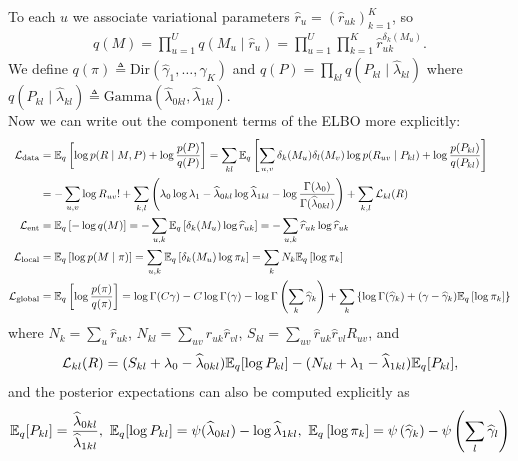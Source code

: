 \documentclass{article}
\begin{document}
 To each $u$ we associate variational parameters $\widehat r_u = \left(\widehat r_{uk}\right)_{k=1}^K$, so
\begin{align}
q(M) = \prod_{u=1}^U q(M_u\mid \widehat r_u) 
= \prod_{u=1}^U \prod_{k=1}^K \widehat r_{uk}^{\delta_k(M_u)}.
\end{align}
We define $q(\pi) \triangleq \text{Dir}(\widehat \gamma_1, \dots, \widehat \gamma_K)$ and $q(P) = \prod_{kl}q(P_{kl}\mid \widehat \lambda_{kl})$ where $q(P_{kl}\mid \widehat \lambda_{kl})\triangleq \text{Gamma}(\widehat \lambda_{0kl},\widehat \lambda_{1kl})$. \\

 Now we can write out the component terms of the ELBO more explicitly:
\begin{equation}
\begin{split}
\mathcal{L}_{\text{data}}
&= \mathbb{E}_q\left[\log p(R\mid M,P)+ \log\frac{p(P)}{q(P)}\right]
= \sum_{kl}\mathbb{E}_q\left[\sum_{u,v}\delta_{k}(M_u)\delta_l(M_v)\log p(R_{uv}\mid P_{kl})+ \log\frac{p(P_{kl})}{q(P_{kl})}\right] \\
&= -\sum_{u,v}\log R_{uv}! + \sum_{k,l} \left(\lambda_{0}\log\lambda_1-\widehat\lambda_{0kl}\log\widehat\lambda_{1kl} - \log\frac{\Gamma(\lambda_0)}{\Gamma(\widehat\lambda_{0kl})}\right) + \sum_{k,l} \mathcal{L}_{kl}(R)
~\\
\mathcal{L}_{\text{ent}}
&= \mathbb{E}_q\left[-\log q(M)\right]
= -\sum_{u,k}\mathbb{E}_q\left[\delta_{k}(M_u)\log \widehat r_{uk}\right]
= -\sum_{u,k}\widehat r_{uk}\log \widehat r_{uk}
~\\
\mathcal{L}_{\text{local}}
&= \mathbb{E}_q\left[\log p(M\mid \pi)\right]
= \sum_{u,k}\mathbb{E}_q\left[\delta_{k}(M_u)\log \pi_k\right]
= \sum_{k}N_k\mathbb{E}_q\left[\log \pi_k\right]
~\\
\mathcal{L}_{\text{global}}
&= \mathbb{E}_q\left[\log\frac{p(\pi)}{q(\pi)}\right]
= \log \Gamma(C\gamma) - C\log\Gamma(\gamma) -\log \Gamma\left(\sum_k\widehat\gamma_k\right) + \sum_k\left\{\log\Gamma(\widehat\gamma_k)+ (\gamma-\widehat\gamma_k)\mathbb{E}_q\left[\log \pi_k\right]\right\}
\end{split}
\end{equation}
where $N_k = \sum_{u}\widehat r_{uk}$, $N_{kl} = \sum_{uv}\widehat r_{uk}\widehat r_{vl}$, $S_{kl} = \sum_{uv}\widehat r_{uk}\widehat r_{vl} R_{uv}$, and 
$$
\mathcal{L}_{kl}(R) 
= (S_{kl} + \lambda_{0} - \widehat\lambda_{0kl}) \mathbb{E}_q[\log P_{kl}]
   -(N_{kl} + \lambda_{1} - \widehat\lambda_{1kl}) \mathbb{E}_q[P_{kl}], 
$$
and the posterior expectations can also be computed explicitly as 
$$
\mathbb{E}_q[P_{kl}] =  \frac{\widehat\lambda_{0kl}}{\widehat\lambda_{1kl}}, ~
\mathbb{E}_q[\log P_{kl}] = \psi(\widehat\lambda_{0kl}) - \log \widehat\lambda_{1kl}, ~
\mathbb{E}_q\left[\log \pi_k\right] = \psi\left(\widehat\gamma_k\right) - \psi\left(\sum_l\widehat\gamma_l\right)
$$
\end{document}
